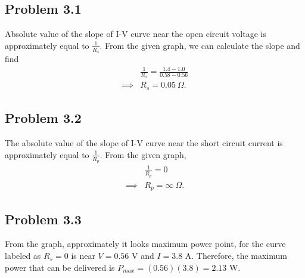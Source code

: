 \subsection*{Problem 3.1}
Absolute value of the slope of I-V curve near the open circuit voltage is approximately equal to $\frac{1}{R_s}$. From the given graph, we can calculate the slope and find
\begin{align*}
	& \frac{1}{R_s} = \frac{1.4-1.0}{0.58-0.56}\\
	\implies & R_s = 0.05\ \Omega.
\end{align*}
\subsection*{Problem 3.2}
The absolute value of the slope of I-V curve near the short circuit current is approximately equal to $\frac{1}{R_p}$. From the given graph,
\begin{align*}
	& \frac{1}{R_p} = 0\\
	\implies & R_p = \infty\ \Omega.
\end{align*}
\subsection*{Problem 3.3}
From the graph, approximately it looks maximum power point, for the curve labeled as $R_s=0$ is near $V=0.56$ V and $I=3.8$ A. Therefore, the maximum power that can be delivered is $P_{max} = (0.56)(3.8) = 2.13$ W.
